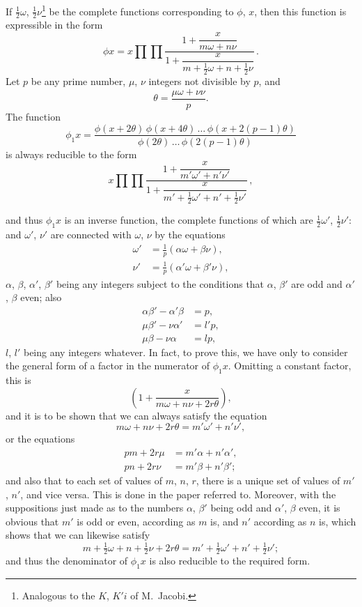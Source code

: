 \documentclass[12pt,a4paper]{article}
\begin{document}
If $\tfrac{1}{2}\omega$, $\tfrac{1}{2}\nu$\footnote{Analogous to the $K$, $K'i$ of M.~Jacobi.} be the complete functions corresponding to $\phi$, $x$, then this function is expressible in the form
\[
\phi x = x \prod\prod \frac{1 + \dfrac{x}{m\omega + n\nu}}{1 + \dfrac{x}{m + \tfrac{1}{2}\omega + n + \tfrac{1}{2}\nu}}\,.
\]
Let $p$ be any prime number, $\mu$, $\nu$ integers not divisible by $p$, and
\[
\theta = \frac{\mu\omega + \nu\nu}{p}.
\]
The function
\[
\phi_1 x = \frac{\phi(x+2\theta)\,\phi(x+4\theta)\,\ldots\,\phi(x+2(p-1)\theta)}{\phi(2\theta)\,\ldots\,\phi(2(p-1)\theta)}
\]
is always reducible to the form
\[
x\prod\prod \frac{1 + \dfrac{x}{m'\omega' + n'\nu'}}{1 + \dfrac{x}{m'+\tfrac{1}{2}\omega' + n'+\tfrac{1}{2}\nu'}}\,,
\]

\newpage
\setcounter{page}{133}

and thus $\phi_1 x$ is an inverse function, the complete functions of which are $\tfrac{1}{2}\omega'$, $\tfrac{1}{2}\nu'$: and $\omega'$, $\nu'$ are connected with $\omega$, $\nu$ by the equations
\begin{align*}
\omega' &= \tfrac{1}{p}(\alpha\omega + \beta\nu),\\
\nu' &= \tfrac{1}{p}(\alpha'\omega + \beta'\nu),
\end{align*}
$\alpha$, $\beta$, $\alpha'$, $\beta'$ being any integers subject to the conditions that $\alpha$, $\beta'$ are odd and $\alpha'$, $\beta$ even; also
\begin{align*}
\alpha\beta' - \alpha'\beta &= p,\\
\mu\beta' - \nu\alpha' &= l'p,\\
\mu\beta - \nu\alpha &= lp,
\end{align*}
$l$, $l'$ being any integers whatever. In fact, to prove this, we have only to consider the general form of a factor in the numerator of $\phi_1 x$. Omitting a constant factor, this is
\[
\left(1 + \frac{x}{m\omega + n\nu + 2r\theta}\right),
\]
and it is to be shown that we can always satisfy the equation
\[
m\omega + n\nu + 2r\theta = m'\omega' + n'\nu',
\]
or the equations
\begin{align*}
pm + 2r\mu &= m'\alpha + n'\alpha',\\
pn + 2r\nu &= m'\beta + n'\beta';
\end{align*}
and also that to each set of values of $m$, $n$, $r$, there is a unique set of values of $m'$, $n'$, and vice versa. This is done in the paper referred to. Moreover, with the suppositions just made as to the numbers $\alpha$, $\beta'$ being odd and $\alpha'$, $\beta$ even, it is obvious that $m'$ is odd or even, according as $m$ is, and $n'$ according as $n$ is, which shows that we can likewise satisfy
\[
m + \tfrac{1}{2}\omega + n + \tfrac{1}{2}\nu + 2r\theta = m' + \tfrac{1}{2}\omega' + n' + \tfrac{1}{2}\nu';
\]
and thus the denominator of $\phi_1 x$ is also reducible to the required form.
\end{document}

